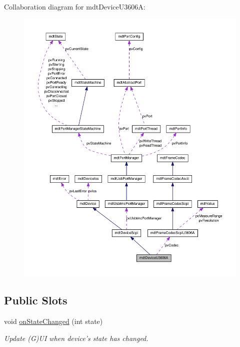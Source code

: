 Collaboration diagram for mdtDeviceU3606A:
\nopagebreak
\begin{figure}[H]
\begin{center}
\leavevmode
\includegraphics[width=400pt]{classmdt_device_u3606_a__coll__graph}
\end{center}
\end{figure}
\subsection*{Public Slots}
\begin{DoxyCompactItemize}
\item 
\hypertarget{classmdt_device_u3606_a_a94a6f8b3f64cd35b33204c66816f3f6a}{
void \hyperlink{classmdt_device_u3606_a_a94a6f8b3f64cd35b33204c66816f3f6a}{onStateChanged} (int state)}
\label{classmdt_device_u3606_a_a94a6f8b3f64cd35b33204c66816f3f6a}

\begin{DoxyCompactList}\small\item\em Update (G)UI when device's state has changed. \end{DoxyCompactList}\end{DoxyCompactItemize}
